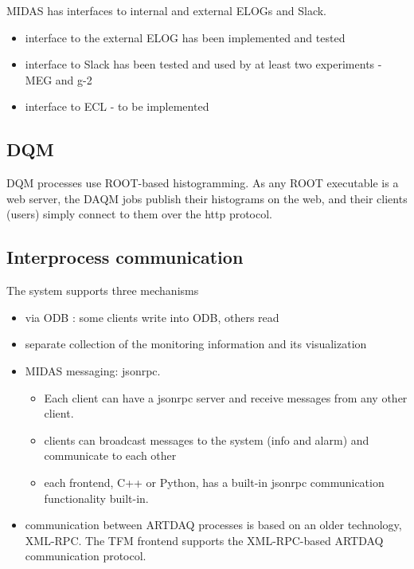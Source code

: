 MIDAS has interfaces to internal and external ELOGs and Slack.
\begin{itemize}
\item
  interface to the external ELOG has been implemented and tested
\item
  interface to Slack has been tested and used by at least two experiments - MEG and g-2
\item
  interface to ECL - to be implemented
\end{itemize}


\subsection{DQM}

DQM processes use ROOT-based histogramming. As any ROOT executable is a web server,
the DAQM jobs publish their histograms on the web, and their clients (users)
simply connect to them over the http protocol.

\subsection{Interprocess communication} 

The system supports three mechanisms
\begin{itemize}
\item
  via ODB : some clients write into ODB, others read
\item
  separate collection of the monitoring information and its visualization
\item
  MIDAS messaging: jsonrpc.
  \begin{itemize}
  \item
    Each client can have a jsonrpc server and receive messages
    from any other client.
  \item
    clients can broadcast messages to the system (info and alarm)
    and communicate to each other
  \item
    each frontend, C++ or Python, has a built-in jsonrpc communication
    functionality built-in.
  \end{itemize}
\item
  communication between ARTDAQ processes is based on an older technology,
  XML-RPC. The TFM frontend supports the XML-RPC-based ARTDAQ communication
  protocol.
\end{itemize}

